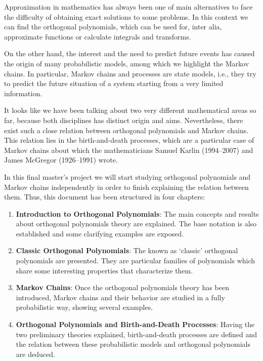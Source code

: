 
Approximation in mathematics has always been one of main alternatives to face the difficulty of obtaining exact solutions to some problems. In this context we can find the orthogonal polynomials, which can be used for, inter alia, approximate functions or calculate integrals and transforms.

On the other hand, the interest and the need to predict future events has caused the origin of many probabilistic models, among which we highlight the Markov chains. In particular, Markov chains and processes are state models, i.e., they try to predict the future situation of a system starting from a very limited information.

It looks like we have been talking about two very different mathematical areas so far, because both disciplines has distinct origin and aims. Nevertheless, there exist such a close relation between orthogonal polynomials and Markov chains. This relation lies in the birth-and-death processes, which are a particular case of Markov chains about which the mathematicians Samuel Karlin (1994--2007) and James McGregor (1926--1991) wrote.

In this final master's project we will start studying orthogonal polynomials and Markov chains independently in order to finish explaining the relation between them. Thus, this document has been structured in four chapters: 

\begin{enumerate}
    \item \textbf{Introduction to Orthogonal Polynomials}: The main concepts and results about orthogonal polynomials theory are explained. The base notation is also established and some clarifying examples are exposed.
    \item \textbf{Classic Orthogonal Polynomials}: The known as `classic' orthogonal polynomials are presented. They are particular families of polynomials which share some interesting properties that characterize them.
    \item \textbf{Markov Chains}: Once the orthogonal polynomials theory has been introduced, Markov chains and their behavior are studied in a fully probabilistic way, showing several examples.
    \item \textbf{Orthogonal Polynomials and Birth-and-Death Processes}: Having the two preliminary theories explained, birth-and-death processes are defined and the relation between these probabilistic models and orthogonal polynomials are deduced.
\end{enumerate}

